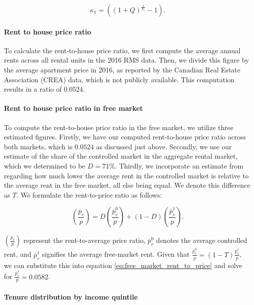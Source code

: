 \documentclass[parskip=full]{article}
\begin{document}
\begin{equation}\label{eq:computing_annual_decrease}
    \kappa_{1}=((1+Q)^{\frac{1}{Y_{c}}}-1).
\end{equation}

\paragraph{Rent to house price ratio}

To calculate the rent-to-house price ratio, we first compute the average annual rents across all rental units in the 2016 RMS data. Then, we divide this figure by the average apartment price in 2016, as reported by the Canadian Real Estate Association (CREA) data, which is not publicly available. This computation results in a ratio of $0.0524$.

\paragraph{Rent to house price ratio in free market}

To compute the rent-to-house price ratio in the free market, we utilize three estimated figures. Firstly, we have our computed rent-to-house price ratio across both markets, which is $0.0524$ as discussed just above. Secondly, we use our estimate of the share of the controlled market in the aggregate rental market, which we determined to be $D=71\%$. Thirdly, we incorporate an estimate from \citet{zhang-gou} regarding how much lower the average rent in the controlled market is relative to the average rent in the free market, all else being equal. We denote this difference as $T$. We formulate the rent-to-price ratio as follows:

\begin{equation}\label{eq:free_market_rent_to_price}
    {\left(\frac{\overline{p}_{r}}{p}\right)}=D \left(\frac{\overline{p}^{0}_{r}}{p}\right)+(1-D) \left(\frac{\overline{p}^{1}_{r}}{p}\right).
\end{equation}

\noindent $\left(\frac{\overline{p}_{r}}{p}\right)$ represent the rent-to-average price ratio, $\overline{p}^{0}_{r}$ denotes the average controlled rent, and $\overline{p}^{1}_{r}$ signifies the average free-market rent. Given that $\frac{\overline{p}^{0}_{r}}{p}=(1-T)\frac{\overline{p}^{1}_{r}}{p}$, we can substitute this into equation \eqref{eq:free_market_rent_to_price} and solve for $\frac{\overline{p}^{1}_{r}}{p}=0.0582$.

\paragraph{Tenure distribution by income quintile}
\end{document}
